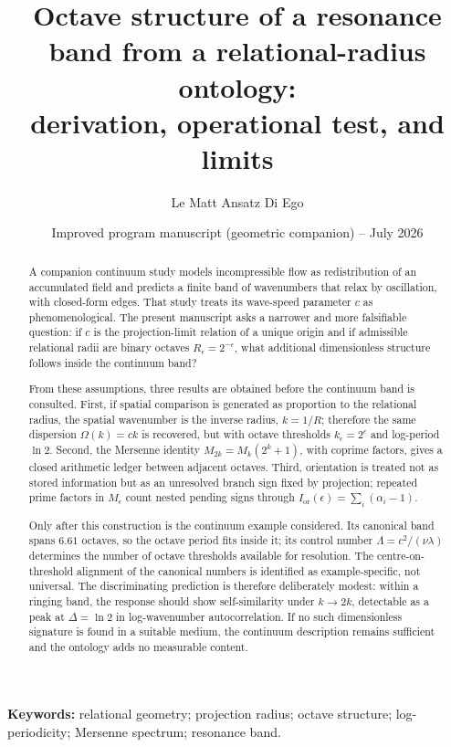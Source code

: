 \documentclass[11pt,a4paper]{article}
\title{\bfseries Octave structure of a resonance band from a relational-radius ontology:\\
derivation, operational test, and limits}
\author{Le Matt Ansatz Di Ego}
\date{Improved program manuscript (geometric companion) -- July 2026}
\newcommand{\Ior}{I_{\mathrm{or}}}
\begin{document}
\maketitle

\begin{abstract}
A companion continuum study models incompressible flow as redistribution of an accumulated field and predicts a finite band of wavenumbers that relax by oscillation, with closed-form edges. That study treats its wave-speed parameter $c$ as phenomenological. The present manuscript asks a narrower and more falsifiable question: if $c$ is the projection-limit relation of a unique origin and if admissible relational radii are binary octaves $R_\epsilon=2^{-\epsilon}$, what additional dimensionless structure follows inside the continuum band?

From these assumptions, three results are obtained before the continuum band is consulted. First, if spatial comparison is generated as proportion to the relational radius, the spatial wavenumber is the inverse radius, $k=1/R$; therefore the same dispersion $\Omega(k)=ck$ is recovered, but with octave thresholds $k_\epsilon=2^\epsilon$ and log-period $\ln2$. Second, the Mersenne identity $M_{2k}=M_k(2^k+1)$, with coprime factors, gives a closed arithmetic ledger between adjacent octaves. Third, orientation is treated not as stored information but as an unresolved branch sign fixed by projection; repeated prime factors in $M_\epsilon$ count nested pending signs through $\Ior(\epsilon)=\sum_i(\alpha_i-1)$.

Only after this construction is the continuum example considered. Its canonical band spans $6.61$ octaves, so the octave period fits inside it; its control number $\Lambda=c^2/(\nu\lambda)$ determines the number of octave thresholds available for resolution. The centre-on-threshold alignment of the canonical numbers is identified as example-specific, not universal. The discriminating prediction is therefore deliberately modest: within a ringing band, the response should show self-similarity under $k\to2k$, detectable as a peak at $\Delta=\ln2$ in log-wavenumber autocorrelation. If no such dimensionless signature is found in a suitable medium, the continuum description remains sufficient and the ontology adds no measurable content.
\end{abstract}

\noindent\textbf{Keywords:} relational geometry; projection radius; octave structure; log-periodicity; Mersenne spectrum; resonance band.
\end{document}
